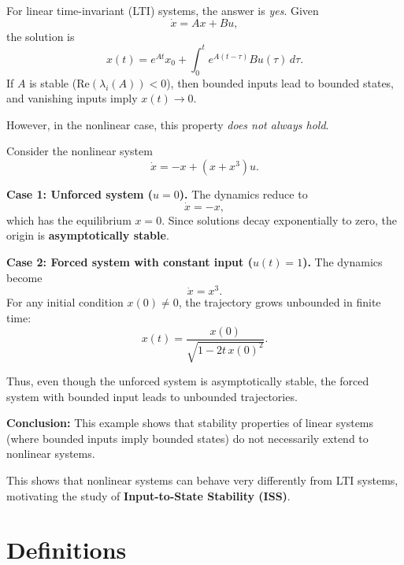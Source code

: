 \noindent
For linear time-invariant (LTI) systems, the answer is \emph{yes}. Given
\begin{equation}
\dot{x} = Ax + Bu,
\end{equation}
the solution is
\begin{equation}
x(t) = e^{At}x_0 + \int_0^t e^{A(t-\tau)}Bu(\tau)\, d\tau.
\end{equation}
If $A$ is stable ($\text{Re}(\lambda_i(A))<0$), then bounded inputs lead to bounded states, and vanishing inputs imply $x(t)\to 0$. 

\noindent
However, in the nonlinear case, this property \emph{does not always hold}.  

\begin{example}
Consider the nonlinear system
\begin{equation}
    \dot{x} = -x + (x+x^3)u.
\end{equation}

\textbf{Case 1: Unforced system ($u=0$).}  
The dynamics reduce to
\begin{equation}
    \dot{x} = -x,
\end{equation}
which has the equilibrium $x=0$. Since solutions decay exponentially to zero, the origin is \textbf{asymptotically stable}.  

\textbf{Case 2: Forced system with constant input ($u(t)=1$).}  
The dynamics become
\begin{equation}
    \dot{x} = x^3.
\end{equation}
For any initial condition $x(0)\neq 0$, the trajectory grows unbounded in finite time:
\begin{equation}
    x(t) = \frac{x(0)}{\sqrt{1 - 2t\,x(0)^2}}.
\end{equation}

Thus, even though the unforced system is asymptotically stable, the forced system with bounded input leads to unbounded trajectories.  

\textbf{Conclusion:} This example shows that stability properties of linear systems (where bounded inputs imply bounded states) do not necessarily extend to nonlinear systems.
\end{example}


This shows that nonlinear systems can behave very differently from LTI systems, motivating the study of \textbf{Input-to-State Stability (ISS)}.

\section{Definitions}


